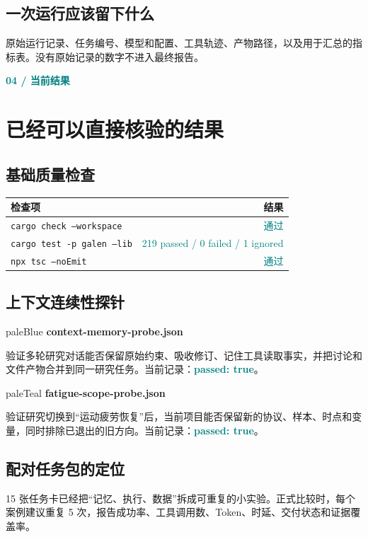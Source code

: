 \documentclass[UTF8,11pt,a4paper]{ctexart}
\newcommand{\kicker}[1]{\textcolor{teal}{\textbf{\small\MakeUppercase{#1}}}\par\vspace{1mm}}
\begin{document}
\subsection*{一次运行应该留下什么}
原始运行记录、任务编号、模型和配置、工具轨迹、产物路径，以及用于汇总的指标表。没有原始记录的数字不进入最终报告。
\clearpage

\kicker{04  /  当前结果}
\section*{已经可以直接核验的结果}
\subsection*{基础质量检查}
\begin{tabularx}{\textwidth}{@{}X r@{}}
\toprule
\textbf{检查项} & \textbf{结果}\\
\midrule
\texttt{cargo check --workspace} & \textcolor{teal}{通过}\\
\texttt{cargo test -p galen --lib} & \textcolor{teal}{219 passed / 0 failed / 1 ignored}\\
\texttt{npx tsc --noEmit} & \textcolor{teal}{通过}\\
\bottomrule
\end{tabularx}

\subsection*{上下文连续性探针}
\begin{card}[colframe=blue]{paleBlue}
\textbf{context-memory-probe.json}\par
验证多轮研究对话能否保留原始约束、吸收修订、记住工具读取事实，并把讨论和文件产物合并到同一研究任务。当前记录：\textcolor{teal}{\textbf{passed: true}}。
\end{card}
\begin{card}[colframe=teal]{paleTeal}
\textbf{fatigue-scope-probe.json}\par
验证研究切换到“运动疲劳恢复”后，当前项目能否保留新的协议、样本、时点和变量，同时排除已退出的旧方向。当前记录：\textcolor{teal}{\textbf{passed: true}}。
\end{card}

\subsection*{配对任务包的定位}
15 张任务卡已经把“记忆、执行、数据”拆成可重复的小实验。正式比较时，每个案例建议重复 5 次，报告成功率、工具调用数、Token、时延、交付状态和证据覆盖率。
\clearpage
\end{document}
